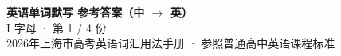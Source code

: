 \documentclass[10pt,a4paper]{article}
\begin{document}
\pagestyle{plain}

\begin{center}
{\LARGE\bfseries 英语单词默写 \quad 参考答案（中 $\to$ 英）}\\[0.22em]
{\large I 字母 · 第 1 / 4 份}\\[0.18em]
{\small 2026年上海市高考英语词汇用法手册 · 参照普通高中英语课程标准}
\end{center}

\vspace{0.2em}
\noindent{\color{rulegray}\rule{\textwidth}{0.8pt}}

\vspace{0.35em}

\vspace{0.25em}
\renewcommand{\arraystretch}{1.32}
\end{document}
